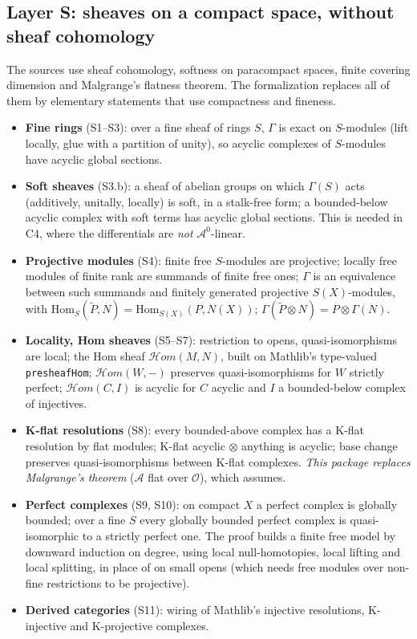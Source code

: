 \documentclass[11pt,a4paper]{article}
\newcommand{\code}[1]{\texttt{#1}}
\newcommand{\cA}{\mathcal{A}}
\newcommand{\Ocal}{\mathcal{O}}
\newcommand{\Hom}{\mathrm{Hom}}
\begin{document}
\subsection{Layer S: sheaves on a compact space, without sheaf cohomology}
The sources use sheaf cohomology, softness on paracompact spaces, finite covering dimension and
Malgrange's flatness theorem. The formalization replaces all of them by elementary statements
that use compactness and fineness.
\begin{itemize}
\item \textbf{Fine rings} (S1--S3): over a fine sheaf of rings $S$, $\Gamma$ is exact on
$S$-modules (lift locally, glue with a partition of unity), so acyclic complexes of $S$-modules
have acyclic global sections.
\item \textbf{Soft sheaves} (S3.b): a sheaf of abelian groups on which $\Gamma(S)$ acts (additively,
unitally, locally) is soft, in a stalk-free form; a bounded-below acyclic complex with soft terms
has acyclic global sections. This is needed in C4, where the differentials are \emph{not}
$\cA^0$-linear.
\item \textbf{Projective modules} (S4): finite free $S$-modules are projective; locally free modules
of finite rank are summands of finite free ones; $\Gamma$ is an equivalence between such summands
and finitely generated projective $S(X)$-modules, with $\Hom_S(\tilde P,N)=\Hom_{S(X)}(P,N(X))$;
$\Gamma(\tilde P\otimes N)=P\otimes\Gamma(N)$.
\item \textbf{Locality, Hom sheaves} (S5--S7): restriction to opens, quasi-isomorphisms are local;
the Hom sheaf $\mathcal Hom(M,N)$, built on Mathlib's type-valued \code{presheafHom};
$\mathcal Hom(W,-)$ preserves quasi-isomorphisms for $W$ strictly perfect; $\mathcal Hom(C,I)$ is
acyclic for $C$ acyclic and $I$ a bounded-below complex of injectives.
\item \textbf{K-flat resolutions} (S8): every bounded-above complex has a K-flat resolution by
flat modules; K-flat acyclic $\otimes$ anything is acyclic; base change preserves
quasi-isomorphisms between K-flat complexes. \emph{This package replaces Malgrange's theorem}
($\cA$ flat over $\Ocal$), which \cite{A} assumes.
\item \textbf{Perfect complexes} (S9, S10): on compact $X$ a perfect complex is globally bounded;
over a fine $S$ every globally bounded perfect complex is quasi-isomorphic to a strictly perfect
one. The proof builds a finite free model by downward induction on degree, using local
null-homotopies, local lifting and local splitting, in place of \cite[Lemma~7.2.10]{A} on small opens
(which needs free modules over non-fine restrictions to be projective).
\item \textbf{Derived categories} (S11): wiring of Mathlib's injective resolutions,
K-injective and K-projective complexes.
\end{itemize}
\end{document}
